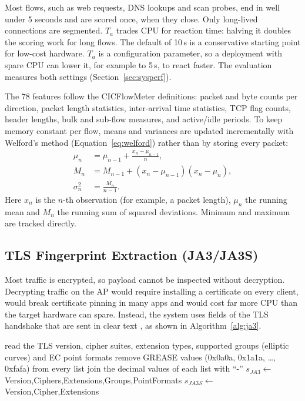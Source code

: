 \noindent Most flows, such as web requests, DNS lookups and scan probes, end in well under 5 seconds and are scored once, when they close. Only long-lived connections are segmented. $T_a$ trades CPU for reaction time: halving it doubles the scoring work for long flows. The default of 10\,s is a conservative starting point for low-cost hardware. $T_a$ is a configuration parameter, so a deployment with spare CPU can lower it, for example to 5\,s, to react faster. The evaluation measures both settings (Section~\ref{sec:sysperf}).

\noindent The 78 features follow the CICFlowMeter definitions: packet and byte counts per direction, packet length statistics, inter-arrival time statistics, TCP flag counts, header lengths, bulk and sub-flow measures, and active/idle periods. To keep memory constant per flow, means and variances are updated incrementally with Welford's method (Equation~\ref{eq:welford}) rather than by storing every packet:
\begin{equation}
\label{eq:welford}
\begin{aligned}
\mu_n &= \mu_{n-1} + \frac{x_n - \mu_{n-1}}{n}, \\
M_n &= M_{n-1} + (x_n - \mu_{n-1})(x_n - \mu_n), \\
\sigma_n^2 &= \frac{M_n}{n-1}.
\end{aligned}
\end{equation}
\noindent Here $x_n$ is the $n$-th observation (for example, a packet length), $\mu_n$ the running mean and $M_n$ the running sum of squared deviations. Minimum and maximum are tracked directly.

\subsection{TLS Fingerprint Extraction (JA3/JA3S)}\label{sec:5.3.3}
\label{sec:ja3}
\noindent Most traffic is encrypted, so payload cannot be inspected without decryption. Decrypting traffic on the AP would require installing a certificate on every client, would break certificate pinning in many apps and would cost far more CPU than the target hardware can spare. Instead, the system uses fields of the TLS handshake that are sent in clear text \cite{nidps:ja3}, as shown in Algorithm~\ref{alg:ja3}.

\begin{algorithm}[H]
\caption{JA3/JA3S fingerprint}
\label{alg:ja3}
read the TLS version, cipher suites, extension types, supported groups (elliptic curves) and EC point formats\;
remove GREASE values (0x0a0a, 0x1a1a, \ldots, 0xfafa) from every list\;
join the decimal values of each list with ``-''\;
$s_{JA3} \leftarrow$ Version,Ciphers,Extensions,Groups,PointFormats\;
$s_{JA3S} \leftarrow$ Version,Cipher,Extensions 
\;
\end{algorithm}


